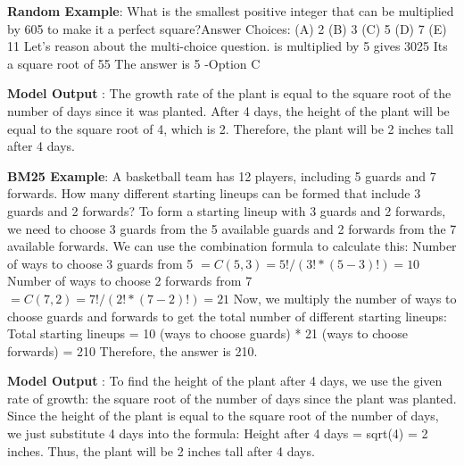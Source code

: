 \begin{wronganswer}
\label{fig:random_example}
\small{\textbf{Random Example}: What is the smallest positive integer that can be multiplied by 605 to make it a perfect square?Answer Choices: (A) 2 (B) 3 (C) 5 (D) 7 (E) 11\newline\newline
Let's reason about the multi-choice question. is multiplied by 5 gives 3025\newline
Its a square root of 55\newline
The answer is 5 -Option C\newline}

\textbf{Model Output \xmark}: \small{The growth rate of the plant is equal to the square root of the number of days since it was planted. After 4 days, the height of the plant will be equal to the square root of 4, which is 2. Therefore, the plant will be 2 inches tall after 4 days.}
\end{wronganswer}

\begin{wronganswer}
\small{\textbf{BM25 Example}: A basketball team has 12 players, including 5 guards and 7 forwards. How many different starting lineups can be formed that include 3 guards and 2 forwards?\newline\newline
To form a starting lineup with 3 guards and 2 forwards, we need to choose 3 guards from the 5 available guards and 2 forwards from the 7 available forwards. We can use the combination formula to calculate this:\newline
Number of ways to choose 3 guards from 5 $= C(5, 3) = 5! / (3! * (5-3)!) = 10$\newline
Number of ways to choose 2 forwards from 7 $= C(7, 2) = 7! / (2! * (7-2)!) = 21$\newline
Now, we multiply the number of ways to choose guards and forwards to get the total number of different starting lineups:\newline
Total starting lineups = 10 (ways to choose guards) * 21 (ways to choose forwards) = 210\newline
Therefore, the answer is 210.\newline
}

\textbf{Model Output \xmark}: \small{To find the height of the plant after 4 days, we use the given rate of growth: the square root of the number of days since the plant was planted. Since the height of the plant is equal to the square root of the number of days, we just substitute 4 days into the formula:\newline
Height after 4 days = sqrt(4) = 2 inches.\newline
Thus, the plant will be 2 inches tall after 4 days.
}
\end{wronganswer}

